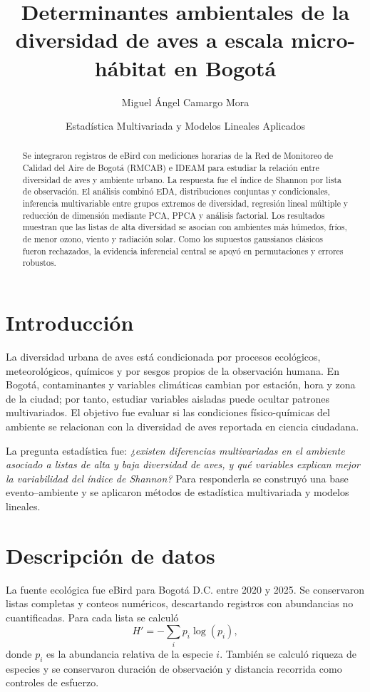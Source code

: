 \documentclass[9pt,letterpaper]{article}
\title{\vspace{-1.4cm}\textbf{Determinantes ambientales de la diversidad de aves a escala micro-hábitat en Bogotá}}
\author{Miguel Ángel Camargo Mora}
\date{Estadística Multivariada y Modelos Lineales Aplicados}
\begin{document}
\maketitle
\vspace{-0.85cm}

\begin{abstract}
\small
Se integraron registros de eBird con mediciones horarias de la Red de Monitoreo de Calidad del Aire de Bogotá (RMCAB) e IDEAM para estudiar la relación entre diversidad de aves y ambiente urbano. La respuesta fue el índice de Shannon por lista de observación. El análisis combinó EDA, distribuciones conjuntas y condicionales, inferencia multivariable entre grupos extremos de diversidad, regresión lineal múltiple y reducción de dimensión mediante PCA, PPCA y análisis factorial. Los resultados muestran que las listas de alta diversidad se asocian con ambientes más húmedos, fríos, de menor ozono, viento y radiación solar. Como los supuestos gaussianos clásicos fueron rechazados, la evidencia inferencial central se apoyó en permutaciones y errores robustos.
\end{abstract}

\section{Introducción}

La diversidad urbana de aves está condicionada por procesos ecológicos, meteorológicos, químicos y por sesgos propios de la observación humana. En Bogotá, contaminantes y variables climáticas cambian por estación, hora y zona de la ciudad; por tanto, estudiar variables aisladas puede ocultar patrones multivariados. El objetivo fue evaluar si las condiciones físico-químicas del ambiente se relacionan con la diversidad de aves reportada en ciencia ciudadana.

La pregunta estadística fue: \textit{¿existen diferencias multivariadas en el ambiente asociado a listas de alta y baja diversidad de aves, y qué variables explican mejor la variabilidad del índice de Shannon?} Para responderla se construyó una base evento--ambiente y se aplicaron métodos de estadística multivariada y modelos lineales.

\section{Descripción de datos}

La fuente ecológica fue eBird para Bogotá D.C. entre 2020 y 2025. Se conservaron listas completas y conteos numéricos, descartando registros con abundancias no cuantificadas. Para cada lista se calculó
\[
H'=-\sum_i p_i\log(p_i),
\]
donde $p_i$ es la abundancia relativa de la especie $i$. También se calculó riqueza de especies y se conservaron duración de observación y distancia recorrida como controles de esfuerzo.
\end{document}

